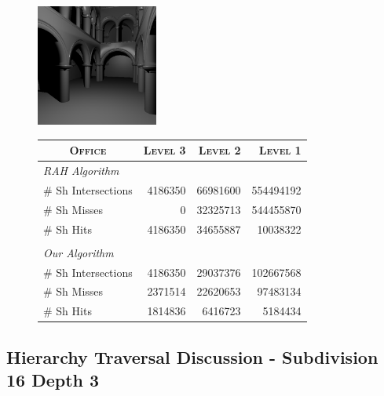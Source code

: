 \begin{figure}[!htb]
    \begin{minipage}{0.25\linewidth}
        \centering
        \includegraphics[width=4.0cm]{Images/Sponza_Preview}
    \end{minipage}
    \begin{minipage}{0.725\linewidth}
        \centering
        \fontsize{8}{10}
        \selectfont
        \begin{tabular}[h]{l|rrr}
            \multicolumn{1}{c|}{\textsc{Office}} & \textsc{Level 3} & \textsc{Level 2} & \textsc{Level 1}\\
            \hline
            \emph{RAH Algorithm} & & \\
            \hline
            \quad \# Sh Intersections   & 4186350   & 66981600	& 554494192	\\
            \quad \# Sh Misses          & 0	        & 32325713	& 544455870	\\
            \quad \# Sh Hits            & 4186350	& 34655887	& 10038322	\\
            & & \\
            \hline
            \emph{Our Algorithm} & & \\
            \hline
            \quad \# Sh Intersections   & 4186350	& 29037376	& 102667568	\\
            \quad \# Sh Misses          & 2371514	& 22620653	& 97483134	\\
            \quad \# Sh Hits            & 1814836	& 6416723	& 5184434	\\
        \end{tabular}
        \label{table:sponza-d16-n3-results}
    \end{minipage}
\end{figure}

\subsection{Hierarchy Traversal Discussion - Subdivision 16 Depth 3}

